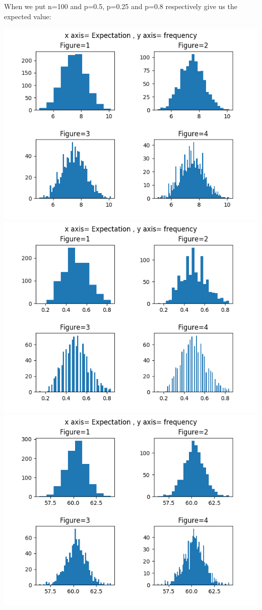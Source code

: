 \documentclass[answers]{exam}
\begin{document}
\begin{framed}
\begin{center}
\end{center}
When we put n=100 and p=0.5, p=0.25 and p=0.8 respectively give us the expected value:
\begin{center}
    \includegraphics[scale=0.6]{hist1.2_p=0.5.png}\\
    \includegraphics[scale=0.6]{hist1.2_p=0.25.png}\\
    \includegraphics[scale=0.6]{hist1.2_p=0.8.png}
\end{center}
\end{framed}
\end{document}
